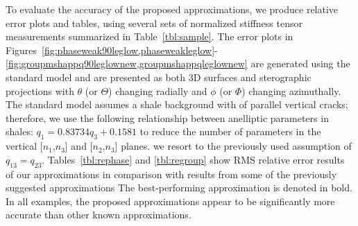 To evaluate the accuracy of the proposed approximations, we produce relative error plots and tables, using several sets of normalized stiffness tensor measurements summarized in Table~\ref{tbl:sample}. The error plots in Figures~\ref{fig:phaseweak90leglow,phaseweakleglow}-\ref{fig:groupmshappq90leglownew,groupmshappqleglownew} are generated using the standard model \cite[]{helbig} and are presented as both 3D surfaces and sterographic projections with $\theta$ (or $\Theta$) changing radially and $\phi$ (or $\Phi$) changing azimuthally. The standard model assumes a shale background with  of parallel vertical cracks; therefore, we use the following relationship between anelliptic parameters in shales: $q_1 = 0.83734 q_3 +0.1581$ to reduce the number of parameters in the vertical [$n_1$,$n_3$] and [$n_2$,$n_3$] planes.  we resort to the previously used assumption of $q_{13}=q_{23}$. Tables~\ref{tbl:rephase} and \ref{tbl:regroup} show RMS relative error results of our approximations in comparison with results from some of the previously suggested approximations  The best-performing approximation is denoted in  bold. In all examples, the proposed approximations appear to be significantly more accurate than  other known approximations.

